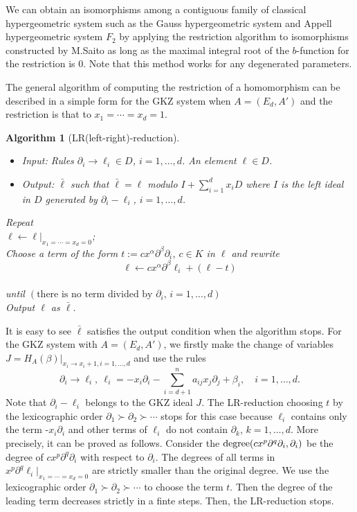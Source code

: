 \documentclass{article}
\def\pd#1{\partial_{#1}}
\newtheorem{algorithm}{Algorithm}
\begin{document}
We can obtain an isomorphisms among a contiguous family of classical
hypergeometric system such as the Gauss hypergeometric system and
Appell hypergeometric system $F_2$ 
by applying the restriction algorithm to isomorphisms constructed by
M.Saito \cite{saito-isom}
as long as the maximal integral root of the $b$-function for the restriction
is $0$.
Note that this method works for any degenerated parameters.

The general algorithm of computing the restriction of a homomorphism
can be described in a simple form for the GKZ system when $A=(E_d,A')$
and the restriction is that to $x_1=\cdots=x_d=1$.

\begin{algorithm}[LR(left-right)-reduction] \ 
\begin{itemize}
\item Input: Rules $\pd{i} \rightarrow \ell_i \in D$, $i=1, \ldots, d$. An element $\ell \in D$. 
\item Output: ${\bar \ell}$ such that
${\bar \ell} = \ell$ modulo $I + \sum_{i=1}^d x_i D$
where $I$ is the left ideal in $D$ generated by $\pd{i}-\ell_i$, $i=1, \dots, d$. 
\end{itemize}
{\rm Repeat}  \\
\quad $\ell \leftarrow \ell |_{x_1=\cdots=x_d=0}$; \\
\quad Choose a term of the form $t:=c x^\alpha \pd{}^\beta \pd{i}$, $c \in K$ in $\ell$
and rewrite 
$$\ell \leftarrow c x^\alpha \pd{}^\beta \ell_i + (\ell - t)$$ \\
{\rm until} $(\mbox{there is no term divided by $\pd{i}$, $i=1, \ldots, d$})$\\
{\rm Output} $\ell$ as ${\bar \ell}$.
\end{algorithm}

It is easy to see ${\bar \ell}$ satisfies the output condition
when the algorithm stops.
For the GKZ system with $A=(E_d,A')$, we firstly make the change of variables
$J=H_A(\beta) |_{x_i \rightarrow x_i+1, i=1, \ldots, d}$
and use the rules
\begin{equation}
\pd{i} \rightarrow \ell_i, \ 
\ell_i= - x_i \pd{i} - \sum_{i=d+1}^n a_{ij} x_j \pd{j} + \beta_i,
\quad i= 1, \ldots, d.
\end{equation}
Note that $\pd{i}-\ell_i$ belongs to the GKZ ideal $J$.
The LR-reduction choosing $t$ by the lexicographic order 
$\pd{1} \succ \pd{2} \succ \cdots$ stops for this case
because $\ell_i$ contains only the term -$x_i \pd{i}$ and
other terms of $\ell_i$ do not contain $\pd{k}$, $k=1, \ldots, d$.
More precisely, it can be proved as follows.
Consider the ${\rm degree}(c x^p \pd{}^q \pd{i},\pd{i})$
be the degree of $c x^p \pd{}^q \pd{i}$ with respect to $\pd{i}$.
The degrees of all terms in $x^p \pd{}^q \ell_i |_{x_1=\cdots=x_d=0}$
are strictly smaller than the original degree.
We use the lexicographic order $\pd{1} \succ \pd{2} \succ \cdots$
to choose the term $t$.
Then the degree of the leading term decreases strictly in a finte steps.
Then, the LR-reduction stops.
\end{document}
